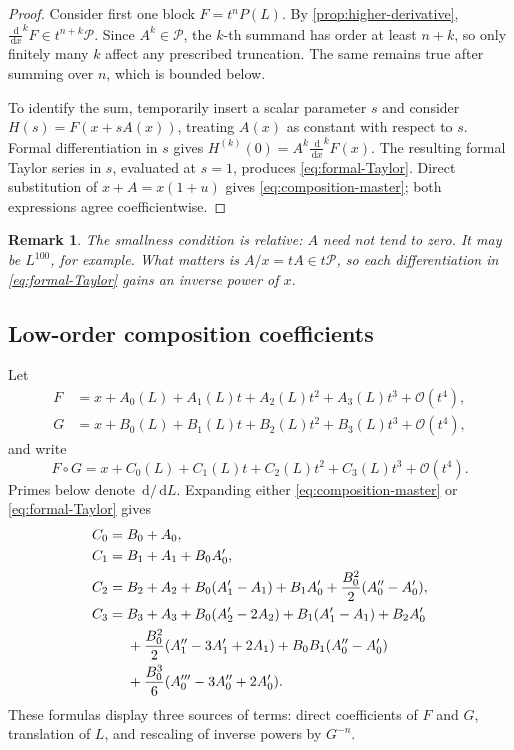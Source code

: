 \documentclass[11pt]{article}
\theoremstyle{pltheorem}
\newtheorem{remark}[theorem]{Remark}
\newcommand{\PL}{\mathscr P}
\newcommand{\dd}{\,\mathrm d}
\newcommand{\bigO}{\mathcal O}
\newcommand{\D}{\frac{\dd}{\dd x}}
\newcommand{\compose}{\mathbin{\circ}}
\begin{document}
\begin{proof}
Consider first one block \(F=t^nP(L)\).  By
\cref{prop:higher-derivative}, \(\D^kF\in t^{n+k}\PL\).  Since
\(A^k\in\PL\), the \(k\)-th summand has order at least \(n+k\), so only finitely many \(k\) affect any prescribed truncation.  The same remains true after summing over \(n\), which is bounded below.

To identify the sum, temporarily insert a scalar parameter \(s\) and consider
\(H(s)=F(x+sA(x))\), treating \(A(x)\) as constant with respect to \(s\).  Formal differentiation in \(s\) gives
\(H^{(k)}(0)=A^k\D^kF(x)\).  The resulting formal Taylor series in \(s\), evaluated at \(s=1\), produces \cref{eq:formal-Taylor}.  Direct substitution of
\(x+A=x(1+u)\) gives \cref{eq:composition-master}; both expressions agree coefficientwise.
\end{proof}

\begin{remark}
The smallness condition is relative: \(A\) need not tend to zero.  It may be \(L^{100}\), for example.  What matters is \(A/x=tA\in t\PL\), so each differentiation in \cref{eq:formal-Taylor} gains an inverse power of \(x\).
\end{remark}

\subsection{Low-order composition coefficients}

Let
\begin{align}
 F&=x+A_0(L)+A_1(L)t+A_2(L)t^2+A_3(L)t^3+\bigO(t^4),
 \label{eq:F-near-low}\\
 G&=x+B_0(L)+B_1(L)t+B_2(L)t^2+B_3(L)t^3+\bigO(t^4),
 \label{eq:G-near-low}
\end{align}
and write
\begin{equation}\label{eq:H-near-low}
 F\compose G=x+C_0(L)+C_1(L)t+C_2(L)t^2+C_3(L)t^3+\bigO(t^4).
\end{equation}
Primes below denote \(\dd/\dd L\).  Expanding either
\cref{eq:composition-master} or \cref{eq:formal-Taylor} gives
\begin{align}
 C_0={}&B_0+A_0,\label{eq:C0-compose}\\
 C_1={}&B_1+A_1+B_0A_0',\label{eq:C1-compose}\\
 C_2={}&B_2+A_2+B_0(A_1'-A_1)+B_1A_0'
 +\frac{B_0^2}{2}(A_0''-A_0'),\label{eq:C2-compose}\\
 C_3={}&B_3+A_3+B_0(A_2'-2A_2)+B_1(A_1'-A_1)+B_2A_0'
 \notag\\
 &+\frac{B_0^2}{2}(A_1''-3A_1'+2A_1)
 +B_0B_1(A_0''-A_0')\notag\\
 &+\frac{B_0^3}{6}(A_0'''-3A_0''+2A_0').
 \label{eq:C3-compose}
\end{align}
These formulas display three sources of terms: direct coefficients of \(F\) and \(G\), translation of \(L\), and rescaling of inverse powers by \(G^{-n}\).
\end{document}
